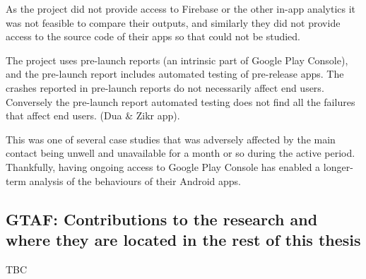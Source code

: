 As the project did not provide access to Firebase or the other in-app analytics it was not feasible to compare their outputs, and similarly they did not provide access to the source code of their apps so that could not be studied.

The project uses pre-launch reports (an intrinsic part of Google Play Console), and the pre-launch report includes automated testing of pre-release apps. The crashes reported in pre-launch reports do not necessarily affect end users. Conversely the pre-launch report automated testing does not find all the failures that affect end users. (Dua \& Zikr app).

This was one of several case studies that was adversely affected by the main contact being unwell and unavailable for a month or so during the active period. Thankfully, having ongoing access to Google Play Console has enabled a longer-term analysis of the behaviours of their Android apps.

\subsection{GTAF: Contributions to the research and where they are located in the rest of this thesis}
TBC


